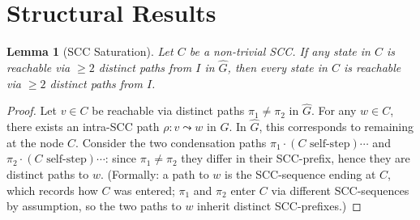 \documentclass[11pt,letterpaper]{article}
\theoremstyle{plain}
\newtheorem{lemma}[theorem]{Lemma}
\theoremstyle{definition}
\theoremstyle{remark}
\newcommand{\Ghat}{\hat{G}}
\begin{document}
\section{Structural Results}
\label{sec:theory}

\begin{lemma}[SCC Saturation]
  \label{lem:scc_sat}
  Let $C$ be a non-trivial SCC.
  If any state in $C$ is reachable via $\geq 2$ distinct paths from $I$
  in $\Ghat$, then every state in $C$ is reachable via $\geq 2$ distinct
  paths from $I$.
\end{lemma}
\begin{proof}
  Let $v \in C$ be reachable via distinct paths $\pi_1 \neq \pi_2$ in $\Ghat$.
  For any $w \in C$, there exists an intra-SCC path $\rho: v \leadsto w$ in $G$.
  In $\Ghat$, this corresponds to remaining at the node $C$.
  Consider the two condensation paths $\pi_1 \cdot (C \text{ self-step}) \cdots$
  and $\pi_2 \cdot (C \text{ self-step}) \cdots$: since $\pi_1 \neq \pi_2$
  they differ in their SCC-prefix, hence they are distinct paths to $w$.
  (Formally: a path to $w$ is the SCC-sequence ending at $C$, which
  records how $C$ was entered; $\pi_1$ and $\pi_2$ enter $C$ via different
  SCC-sequences by assumption, so the two paths to $w$ inherit distinct
  SCC-prefixes.)
\end{proof}
\end{document}
